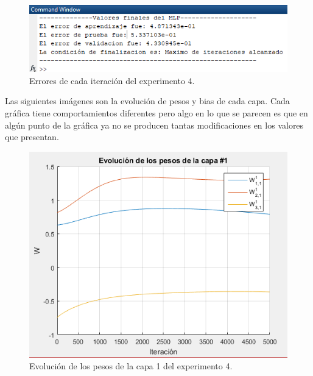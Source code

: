 \begin{figure}[H]
    \begin{center}
        \includegraphics[width=14cm]{4/salida.png}
        \caption{Errores de cada iteración del experimento 4.}
        \label{fig:salida4}
    \end{center}
\end{figure}
Las siguientes imágenes son la evolución de pesos y bias de cada capa. Cada gráfica tiene comportamientos diferentes pero algo en lo que se parecen es que en algún punto de la gráfica ya no se producen tantas modificaciones en los valores que presentan.
\begin{figure}[H]
    \begin{center}
        \includegraphics[width=12cm]{4/pesos1.png}
        \caption{Evolución de los pesos de la capa 1 del experimento 4.}
        \label{fig:pesos8}
    \end{center}
\end{figure}

